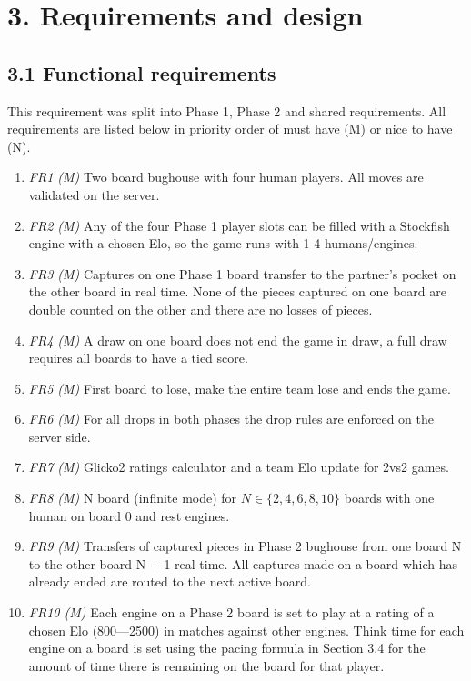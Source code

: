 \documentclass[11pt,a4paper]{article}
\begin{document}
\section*{3. Requirements and design}
\subsection*{3.1 Functional requirements}

This requirement was split into Phase 1, Phase 2 and shared requirements. All requirements are listed below in priority order of must have (M) or nice to have (N).

\begin{enumerate}[leftmargin=*]
\item  \textit{FR1 (M)} Two board bughouse with four human players.  All moves are validated on the server.
\item \textit{FR2 (M)} Any of the four Phase 1 player slots can be filled with a Stockfish engine with a chosen Elo, so the game runs with 1-4 humans/engines.
\item \textit{FR3 (M)} Captures on one Phase 1 board transfer to the partner’s pocket on the other board in real time. None of the pieces captured on one board are double counted on the other and there are no losses of pieces.
\item \textit{FR4 (M)} A draw on one board does not end the game in draw, a full draw requires all boards to have a tied score.
\item \textit{FR5 (M)} First board to lose, make the entire team lose and ends the game.
\item \textit{FR6 (M)} For all drops in both phases the drop rules are enforced on the server side.
\item \textit{FR7 (M)} Glicko2 ratings calculator and a team Elo update for 2vs2 games.
\item \textit{FR8 (M)} N board (infinite mode) for $N \in \{2, 4, 6, 8, 10\}$ boards with one human on board 0 and rest engines.
\item \textit{FR9 (M)} Transfers of captured pieces in Phase 2 bughouse from one board N to the other board N + 1 real time. All captures made on a board which has already ended are routed to the next active board.
\item \textit{FR10 (M)} Each engine on a Phase 2 board is set to play at a rating of a chosen Elo (800—2500) in matches against other engines. Think time for each engine on a board is set using the pacing formula in Section 3.4 for the amount of time there is remaining on the board for that player.

\end{enumerate}
\end{document}
